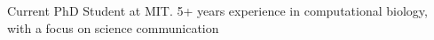 

\begin{cvparagraph}

Current PhD Student at MIT. 5+ years experience in computational biology, with a focus on science communication
\end{cvparagraph}
